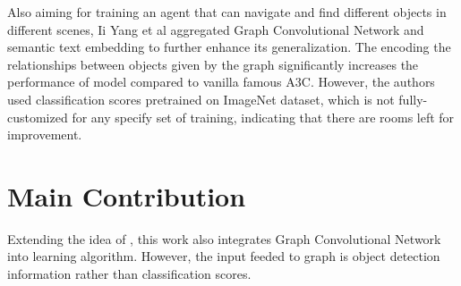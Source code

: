 Also aiming for training an agent that can navigate and find different objects in different scenes, Ii Yang et al \cite{iiyang} aggregated Graph Convolutional Network and semantic text embedding to further enhance its generalization. The encoding the relationships between objects given by the graph significantly increases the performance of model compared to vanilla famous A3C. However, the authors used classification scores pretrained on ImageNet \cite{imagenet} dataset, which is not fully-customized for any specify set of training, indicating that there are rooms left for improvement. 

\section{Main Contribution}

Extending the idea of \cite{iiyang}, this work also integrates Graph Convolutional Network into learning algorithm. However, the input feeded to graph is object detection information rather than classification scores.
